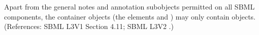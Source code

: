 Apart from the general notes and annotation subobjects permitted on all
SBML components, the \ListOfSpeciesReferences container objects (\ie the
\Reaction elements  and ) may
only contain \SpeciesReference objects.  (References: SBML L3V1 Section 4.11; SBML L3V2
.)
